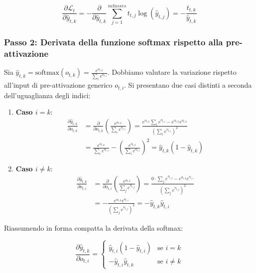 ﻿\documentclass[11pt, a4paper]{article}
\begin{document}
\[
\frac{\partial \mathcal{L}_t}{\partial \hat{y}_{t,k}} = - \frac{\partial}{\partial \hat{y}_{t,k}} \sum_{j=1}^{nclasses} t_{t,j} \log(\hat{y}_{t,j}) = - \frac{t_{t,k}}{\hat{y}_{t,k}}
\]

\subsubsection{Passo 2: Derivata della funzione softmax rispetto alla pre-attivazione}

Sia $\hat{y}_{t,k} = \text{softmax}(o_{t,k}) = \frac{e^{o_{t,k}}}{\sum_i e^{o_{t,i}}}$. Dobbiamo valutare la variazione rispetto all'input di pre-attivazione generico $o_{t,i}$. Si presentano due casi distinti a seconda dell'uguaglianza degli indici:

\begin{enumerate}
    \item \textbf{Caso $i = k$}:
    \begin{align*}
    \frac{\partial \hat{y}_{t,k}}{\partial o_{t,k}} &= \frac{\partial}{\partial o_{t,k}} \left( \frac{e^{o_{t,k}}}{\sum_i e^{o_{t,i}}} \right) = \frac{e^{o_{t,k}}\sum_i e^{o_{t,i}} - e^{o_{t,k}}e^{o_{t,k}}}{\left(\sum_i e^{o_{t,i}}\right)^2} \\
    &= \frac{e^{o_{t,k}}}{\sum_i e^{o_{t,i}}} - \left(\frac{e^{o_{t,k}}}{\sum_i e^{o_{t,i}}}\right)^2 = \hat{y}_{t,k}(1 - \hat{y}_{t,k})
    \end{align*}

    \item \textbf{Caso $i \neq k$}:
    \begin{align*}
    \frac{\partial \hat{y}_{t,k}}{\partial o_{t,i}} &= \frac{\partial}{\partial o_{t,i}} \left( \frac{e^{o_{t,k}}}{\sum_j e^{o_{t,j}}} \right) = \frac{0 \cdot \sum_j e^{o_{t,j}} - e^{o_{t,k}}e^{o_{t,i}}}{\left(\sum_j e^{o_{t,j}}\right)^2} \\
    &= -\frac{e^{o_{t,k}} e^{o_{t,i}}}{\left(\sum_j e^{o_{t,j}}\right)^2} = -\hat{y}_{t,k}\hat{y}_{t,i}
    \end{align*}
\end{enumerate}

Riassumendo in forma compatta la derivata della softmax:

\[
\frac{\partial \hat{y}_{t,k}}{\partial o_{t,i}} = \begin{cases}
\hat{y}_{t,i}(1 - \hat{y}_{t,i}) & \text{se } i = k \\
-\hat{y}_{t,i}\hat{y}_{t,k} & \text{se } i \neq k
\end{cases}
\]
\end{document}
